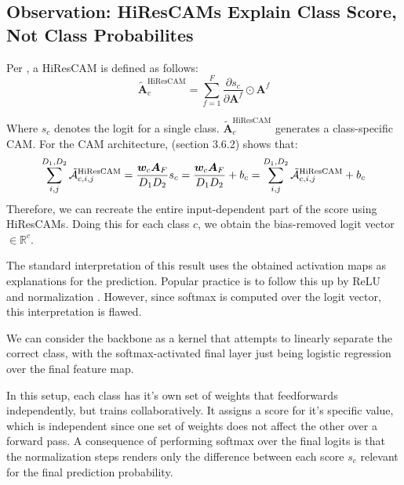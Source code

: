 \documentclass{article}
\theoremstyle{plain}
\theoremstyle{definition}
\theoremstyle{remark}
\begin{document}
\subsection{Observation: HiResCAMs Explain Class Score, Not Class Probabilites}

Per \cite{draelos2020use}, a HiResCAM is defined as follows:
\begin{equation}
	\tilde{\mathcal{\bm{A}}}_c^{\text{HiResCAM}} = \sum^F_{f=1} \frac{\partial s_c}{\partial \bm{A}^f} \odot \bm{A}^f
\end{equation}

Where $s_c$ denotes the logit for a single class. $\tilde{\mathcal{\bm{A}}}_c^{\text{HiResCAM}}$ generates a class-specific CAM. For the CAM architecture, \cite{draelos2020use} (section 3.6.2) shows that:
\begin{equation}
	\sum^{D_1,D_2}_{i,j} \tilde{\mathcal{\bm{A}}}_{c,i,j}^{\text{HiResCAM}} = \frac{\bm{w}_c \bm{A}_F}{D_1 D_2} \\
	s_c = \frac{\bm{w}_c \bm{A}_F}{D_1 D_2} + b_c = \sum^{D_1,D_2}_{i,j} \tilde{\mathcal{\bm{A}}}_{c,i,j}^{\text{HiResCAM}} + b_c
\end{equation}
Therefore, we can recreate the entire input-dependent part of the score using HiResCAMs. Doing this for each class $c$, we obtain the bias-removed logit vector $\in \mathbb{R}^{c}$.

The standard interpretation of this result uses the obtained activation maps as explanations for the prediction. Popular practice is to follow this up by ReLU and normalization \citep{draelos2020use}. However, since softmax is computed over the logit vector, this interpretation is flawed.

We can consider the backbone as a kernel that attempts to linearly separate the correct class, with the softmax-activated final layer just being logistic regression over the final feature map.

In this setup, each class has it's own set of weights that feedforwards independently, but trains collaboratively. It assigns a score for it's specific value, which is independent since one set of weights does not affect the other over a forward pass. A consequence of performing softmax over the final logits is that the normalization steps renders only the difference between each score $s_c$ relevant for the final prediction probability.
\end{document}
